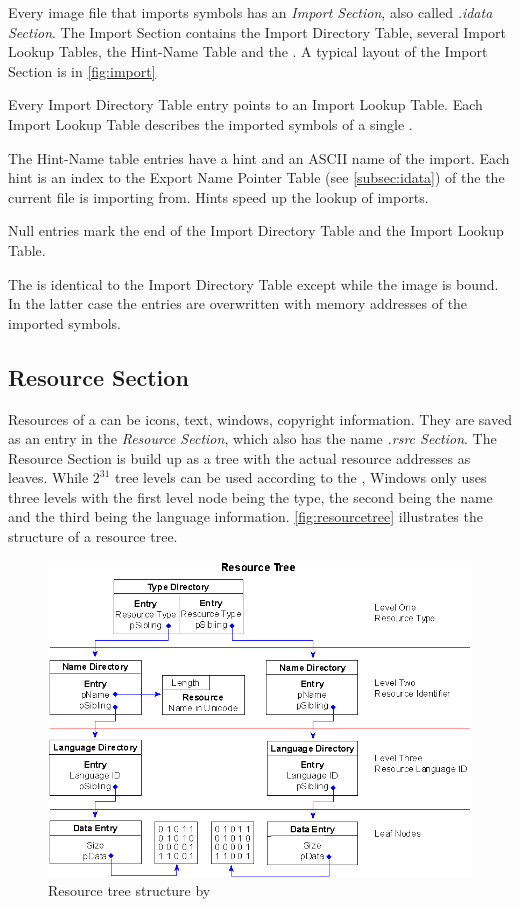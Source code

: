 Every image file that imports symbols has an \emph{Import Section}, also called \emph{.idata Section}.
The Import Section contains the Import Directory Table, several Import Lookup Tables, the Hint-Name Table and the \IAT{}. A typical layout of the Import Section is in \autoref{fig:import}

Every Import Directory Table entry points to an Import Lookup Table. Each Import Lookup Table describes the imported symbols of a single \DLL{}.

The Hint-Name table entries have a hint and an ASCII name of the import. Each hint is an index to the Export Name Pointer Table (see \autoref{subsec:idata}) of the \DLL{} the current file is importing from. Hints speed up the lookup of imports.

Null entries mark the end of the Import Directory Table and the Import Lookup Table.

The \IAT{} is identical to the Import Directory Table except while the image is bound. In the latter case the \IAT{} entries are overwritten with memory addresses of the imported symbols.

\subsection*{Resource Section}

Resources of a \PE{} can be \ia{} icons, text, windows, copyright information. They are saved as an entry in the \emph{Resource Section}, which also has the name \emph{.rsrc Section}. The Resource Section is build up as a tree with the actual resource addresses as leaves. While \(2^{31}\) tree levels can be used according to the \PECOFF{} \cite[]{pespec}, Windows only uses three levels with the first level node being the type, the second being the name and the third being the language information. \autoref{fig:resourcetree} illustrates the structure of a resource tree.

\begin{figure}
\includegraphics[width=.98\textwidth, height=\textheight,keepaspectratio]{graphics/resourcetree}
\caption{ Resource tree structure by }
\label{fig:resourcetree} 
\end{figure}

